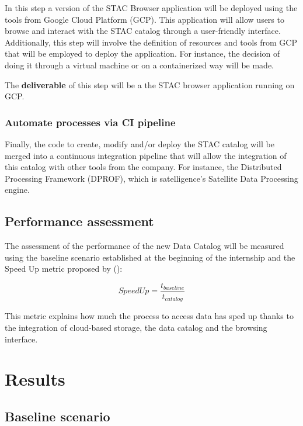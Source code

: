 \documentclass[
  oneside,
  open=any]{scrbook}
\begin{document}
In this step a version of the STAC Browser application will be deployed
using the tools from Google Cloud Platform (GCP). This application will
allow users to browse and interact with the STAC catalog through a
user-friendly interface. Additionally, this step will involve the
definition of resources and tools from GCP that will be employed to
deploy the application. For instance, the decision of doing it through a
virtual machine or on a containerized way will be made.

The \textbf{deliverable} of this step will be a the STAC browser
application running on GCP.

\subsection{Automate processes via CI
pipeline}\label{automate-processes-via-ci-pipeline}

Finally, the code to create, modify and/or deploy the STAC catalog will
be merged into a continuous integration pipeline that will allow the
integration of this catalog with other tools from the company. For
instance, the Distributed Processing Framework (DPROF), which is
satelligence's Satellite Data Processing engine.

\section{Performance assessment}\label{performance-assessment}

The assessment of the performance of the new Data Catalog will be
measured using the baseline scenario established at the beginning of the
internship and the Speed Up metric proposed by
():

\[ SpeedUp = \frac{t_{baseline}}{t_{catalog}} \]

This metric explains how much the process to access data has sped up
thanks to the integration of cloud-based storage, the data catalog and
the browsing interface.

\chapter{Results}\label{results}

\section{Baseline scenario}\label{baseline-scenario}
\end{document}
